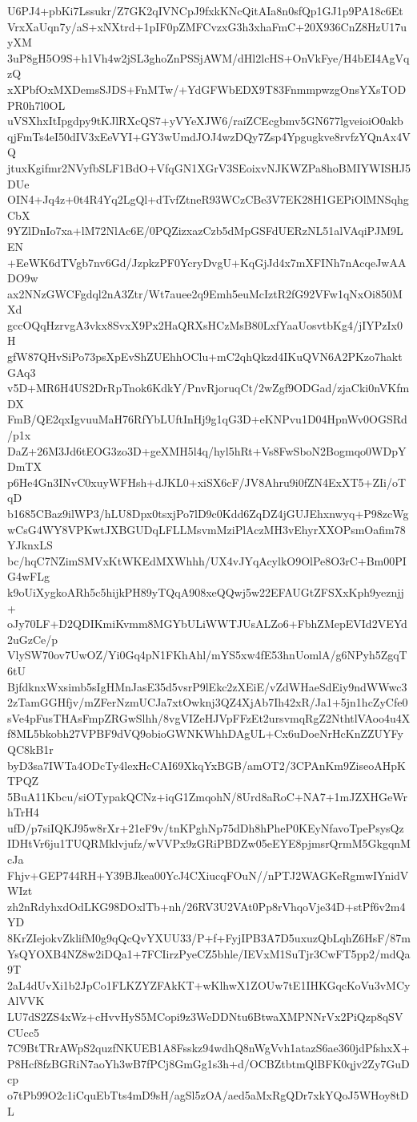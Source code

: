 U6PJ4+pbKi7Lssukr/Z7GK2qIVNCpJ9fxkKNcQitAIa8n0sfQp1GJ1p9PA18c6Et
VrxXaUqn7y/aS+xNXtrd+1pIF0pZMFCvzxG3h3xhaFmC+20X936CnZ8HzU17uyXM
3uP8gH5O9S+h1Vh4w2jSL3ghoZnPSSjAWM/dHl2lcHS+OnVkFye/H4bEI4AgVqzQ
xXPbfOxMXDemsSJDS+FnMTw/+YdGFWbEDX9T83FnmmpwzgOnsYXsTODPR0h7l0OL
uVSXhxItIpgdpy9tKJlRXcQS7+yVYeXJW6/raiZCEcgbmv5GN677lgveioiO0akb
qjFmTs4eI50dIV3xEeVYI+GY3wUmdJOJ4wzDQy7Zsp4Ypgugkve8rvfzYQnAx4VQ
jtuxKgifmr2NVyfbSLF1BdO+VfqGN1XGrV3SEoixvNJKWZPa8hoBMIYWISHJ5DUe
OIN4+Jq4z+0t4R4Yq2LgQl+dTvfZtneR93WCzCBe3V7EK28H1GEPiOlMNSqhgCbX
9YZlDnIo7xa+lM72NlAc6E/0PQZizxazCzb5dMpGSFdUERzNL51alVAqiPJM9LEN
+EeWK6dTVgb7nv6Gd/JzpkzPF0YcryDvgU+KqGjJd4x7mXFINh7nAcqeJwAADO9w
ax2NNzGWCFgdql2nA3Ztr/Wt7auee2q9Emh5euMcIztR2fG92VFw1qNxOi850MXd
gccOQqHzrvgA3vkx8SvxX9Px2HaQRXsHCzMsB80LxfYaaUosvtbKg4/jIYPzIx0H
gfW87QHvSiPo73psXpEvShZUEhhOClu+mC2qhQkzd4IKuQVN6A2PKzo7haktGAq3
v5D+MR6H4US2DrRpTnok6KdkY/PnvRjoruqCt/2wZgf9ODGad/zjaCki0nVKfmDX
FmB/QE2qxIgvuuMaH76RfYbLUftInHj9g1qG3D+eKNPvu1D04HpnWv0OGSRd/p1x
DaZ+26M3Jd6tEOG3zo3D+geXMH5l4q/hyl5hRt+Vs8FwSboN2Bogmqo0WDpYDmTX
p6He4Gn3INvC0xuyWFHsh+dJKL0+xiSX6cF/JV8Ahru9i0fZN4ExXT5+ZIi/oTqD
b1685CBaz9ilWP3/hLU8Dpx0tsxjPo7lD9c0Kdd6ZqDZ4jGUJEhxnwyq+P98zcWg
wCsG4WY8VPKwtJXBGUDqLFLLMsvmMziPlAczMH3vEhyrXXOPsmOafim78YJknxLS
bc/hqC7NZimSMVxKtWKEdMXWhhh/UX4vJYqAcylkO9OlPe8O3rC+Bm00PIG4wFLg
k9oUiXygkoARh5c5hijkPH89yTQqA908xeQQwj5w22EFAUGtZFSXxKph9yeznjj+
oJy70LF+D2QDIKmiKvmm8MGYbULiWWTJUsALZo6+FbhZMepEVId2VEYd2uGzCe/p
VlySW70ov7UwOZ/Yi0Gq4pN1FKhAhl/mYS5xw4fE53hnUomlA/g6NPyh5ZgqT6tU
BjfdknxWxsimb5sIgHMnJasE35d5vsrP9lEkc2zXEiE/vZdWHaeSdEiy9ndWWwc3
2zTamGGHfjv/mZFerNzmUCJa7xtOwknj3QZ4XjAb7Ih42xR/Ja1+5jn1hcZyCfe0
sVe4pFusTHAsFmpZRGwSlhh/8vgVIZeHJVpFFzEt2ursvmqRgZ2NthtlVAoo4u4X
f8ML5bkobh27VPBF9dVQ9obioGWNKWhhDAgUL+Cx6uDoeNrHcKnZZUYFyQC8kB1r
byD3sa7IWTa4ODcTy4lexHcCAI69XkqYxBGB/amOT2/3CPAnKm9ZiseoAHpKTPQZ
5BuA11Kbcu/siOTypakQCNz+iqG1ZmqohN/8Urd8aRoC+NA7+1mJZXHGeWrhTrH4
ufD/p7siIQKJ95w8rXr+21eF9v/tnKPghNp75dDh8hPheP0KEyNfavoTpePsysQz
IDHtVr6ju1TUQRMklvjufz/wVVPx9zGRiPBDZw05eEYE8pjmsrQrmM5GkgqnMcJa
Fhjv+GEP744RH+Y39BJkea00YcJ4CXiucqFOuN//nPTJ2WAGKeRgmwIYnidVWIzt
zh2nRdyhxdOdLKG98DOxlTb+nh/26RV3U2VAt0Pp8rVhqoVje34D+stPf6v2m4YD
8KrZIejokvZklifM0g9qQcQvYXUU33/P+f+FyjIPB3A7D5uxuzQbLqhZ6HsF/87m
YsQYOXB4NZ8w2iDQa1+7FCIirzPyeCZ5bhle/IEVxM1SuTjr3CwFT5pp2/mdQa9T
2aL4dUvXi1b2JpCo1FLKZYZFAkKT+wKlhwX1ZOUw7tE1IHKGqcKoVu3vMCyAlVVK
LU7dS2ZS4xWz+cHvvHyS5MCopi9z3WeDDNtu6BtwaXMPNNrVx2PiQzp8qSVCUcc5
7C9BtTRrAWpS2quzfNKUEB1A8Fsskz94wdhQ8nWgVvh1atazS6ae360jdPfshxX+
P8Hcf8fzBGRiN7aoYh3wB7fPCj8GmGg1s3h+d/OCBZtbtmQlBFK0qjv2Zy7GuDcp
o7tPb99O2c1iCquEbTts4mD9sH/agSl5zOA/aed5aMxRgQDr7xkYQoJ5WHoy8tDL
